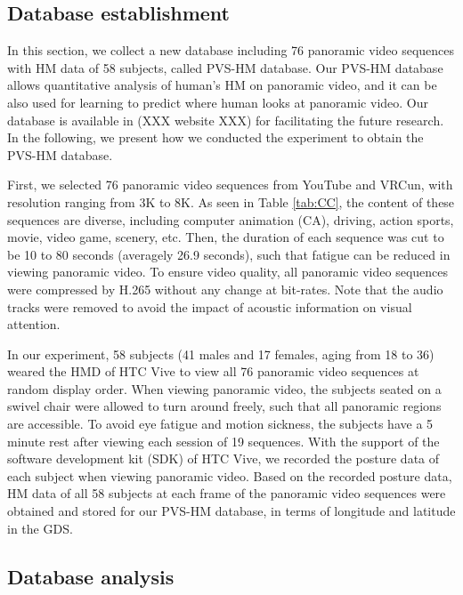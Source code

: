 \documentclass[10pt,journal,compsoc]{IEEEtran}
\begin{document}
\subsection{Database establishment}
\label{Database_establishment}

In this section, we collect a new database including 76 panoramic video sequences with HM data of 58 subjects, called PVS-HM database. Our PVS-HM database allows quantitative analysis of human's HM on panoramic video, and it can be also used for learning to predict where human looks at panoramic video. Our database is available in  (XXX website XXX) for facilitating the future research. In the following, we present how we conducted the experiment to obtain the PVS-HM database.

First, we selected 76 panoramic video sequences from YouTube and VRCun, with resolution ranging from 3K to 8K.
As seen in Table \ref{tab:CC}, the content of these sequences are diverse, including computer animation (CA), driving, action sports, movie, video game, scenery, etc.
Then, the duration of each sequence was cut to be 10 to 80 seconds (averagely 26.9 seconds), such that fatigue can be reduced in viewing panoramic video.
To ensure video quality, all panoramic video sequences were compressed by H.265 \cite{Sullivan2013Overview} without any change at bit-rates.
Note that the audio tracks were removed to avoid the impact of acoustic information on visual attention.

In our experiment, 58 subjects (41 males and 17 females, aging from 18 to 36) weared the HMD of HTC Vive to view all 76 panoramic video sequences at random display order.
When viewing panoramic video, the subjects seated on a swivel chair were allowed to turn around freely, such that all panoramic regions are accessible.
To avoid eye fatigue and motion sickness, the subjects have a 5 minute rest after viewing each session of 19 sequences.
With the support of the software development kit (SDK) of HTC Vive, we recorded the posture data of each subject when viewing panoramic video.
Based on the recorded posture data, HM data of all 58 subjects at each frame of the panoramic video sequences were obtained and stored for our PVS-HM database, in terms of longitude and latitude in the GDS.


\subsection{Database analysis}
\label{Database_analysis}
\end{document}

